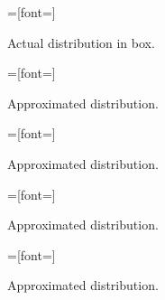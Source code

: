 
\setlength{}
\setlength{}

\begin{figure}[H]
{}=[font=\scriptsize]

\caption{Actual distribution in box.}
\label{fig:elong10}
\end{figure}

\begin{figure}[H]
{}=[font=\scriptsize]

\caption{Approximated distribution.}
\label{fig:elong30}
\end{figure}

\begin{figure}[H]
{}=[font=\scriptsize]

\caption{Approximated distribution.}
\label{fig:elong50}
\end{figure}

\begin{figure}[H]
{}=[font=\scriptsize]

\caption{Approximated distribution.}
\label{fig:elong100}
\end{figure}
\vfill

\setlength{}
\setlength{}

\begin{figure}[H]
{}=[font=\scriptsize]

\caption{Approximated distribution.}
\label{fig:elong100}
\end{figure}
